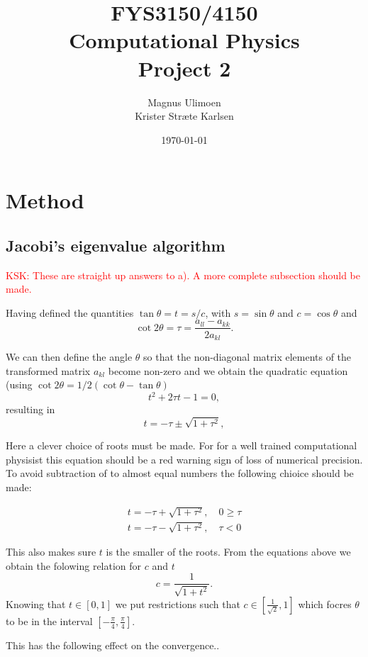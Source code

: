 \documentclass[11pt,a4paper,english]{article}
\title{FYS3150/4150\\Computational Physics\\Project 2}
\author{Magnus Ulimoen\\Krister Stræte Karlsen}
\date{\today}
\numberwithin{equation}{section}
\begin{document}
\maketitle

\section{Method}

 
\subsection{Jacobi's eigenvalue algorithm}

\textcolor{red}{KSK: These are straight up answers to a). A more complete subsection should be made.}

Having defined the quantities $\tan\theta = t= s/c$, with $s=\sin\theta$ and $c=\cos\theta$ and
\[\cot 2\theta=\tau = \frac{a_{ll}-a_{kk}}{2a_{kl}}.
\]

We can then define the angle $\theta$ so that the non-diagonal matrix elements of the transformed matrix 
$a_{kl}$ become non-zero and
we obtain the quadratic equation (using $\cot 2\theta=1/2(\cot \theta-\tan\theta)$
\[
t^2+2\tau t-1= 0,
\]
resulting in 
\[
  t = -\tau \pm \sqrt{1+\tau^2},
\]

Here a clever choice of roots must be made. For for a well trained computational physisist this equation should be a red warning sign of loss of numerical precision. To avoid subtraction of to almost equal numbers the following chioice should be made:

\begin{align*}
t=  -\tau + \sqrt{1+\tau^2}, \quad   0  \geq \tau \\
t=  -\tau - \sqrt{1+\tau^2}, \quad   \tau <  0
\end{align*}

This also makes sure $t$ is the smaller of the roots. From the equations above we obtain the folowing relation for $c$ and $t$
\[
   c = \frac{1}{\sqrt{1+t^2}}.
\]
Knowing that $t \in [0,1]$ we put restrictions such that $c \in [\frac{1}{\sqrt{2}}, 1]$ which focres $\theta$ to be in the interval $[- \frac{\pi}{4},\frac{\pi}{4}]$.  

This has the following effect on the convergence.. 
\end{document}
